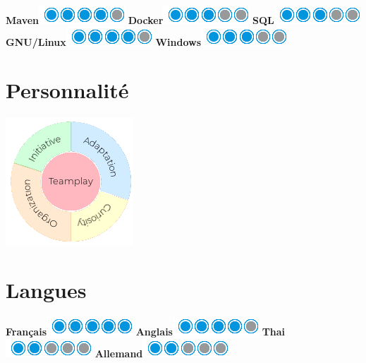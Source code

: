 \documentclass[]{friggeri-cv}
\begin{document}
\begin{aside}
    \textbf{Maven}\includegraphics[scale=0.40]{img/4puces.png}
    \textbf{Docker}\includegraphics[scale=0.40]{img/3puces.png}
    \textbf{SQL}\includegraphics[scale=0.40]{img/3puces.png}
    \textbf{GNU/Linux}\includegraphics[scale=0.40]{img/4puces.png}
    \textbf{Windows}\includegraphics[scale=0.40]{img/3puces.png}
    ~
  \section{Personnalité}
  \hspace{1cm}
    \includegraphics[scale=0.62]{img/personal.png}
    ~
  \section{Langues}
  \hspace{1cm}
    \textbf{Français}\includegraphics[scale=0.40]{img/5puces.png}
    \textbf{Anglais}\includegraphics[scale=0.40]{img/4puces.png}
    \textbf{Thai}\includegraphics[scale=0.40]{img/2puces.png}
    \textbf{Allemand}\includegraphics[scale=0.40]{img/2puces.png}
\end{aside}
\end{document}
